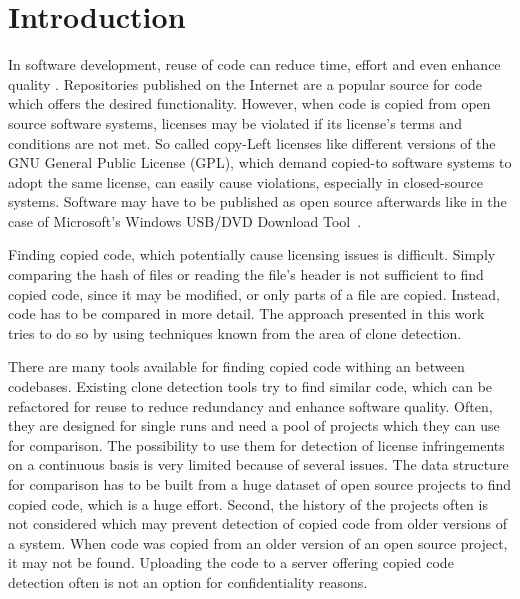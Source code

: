 
\chapter{Introduction}\label{chapter:introduction}
In software development, reuse of code can reduce time, effort and even enhance quality \cite{krueger1992software}.
Repositories published on the Internet are a popular source for code which offers the desired functionality.
However, when code is copied from open source software systems, licenses may be violated if its license's terms and conditions are not met.
So called copy-Left licenses like different versions of the GNU General Public License (GPL), which demand copied-to software systems to adopt the same license, can easily cause violations, especially in closed-source systems.
Software may have to be published as open source afterwards like in the case of Microsoft's \glqq Windows USB/DVD Download Tool\grqq \ \cite{microsoft2009download}.

Finding copied code, which potentially cause licensing issues is difficult.
Simply comparing the hash of files or reading the file's header is not sufficient to find copied code, since it may be modified, or only parts of a file are copied.
Instead, code has to be compared in more detail.
The approach presented in this work tries to do so by using techniques known from the area of clone detection.

There are many tools available for finding copied code withing an between codebases.
Existing clone detection tools try to find similar code, which can be refactored for reuse to reduce redundancy and enhance software quality.
Often, they are designed for single runs and need a pool of projects which they can use for comparison.
The possibility to use them for detection of license infringements on a continuous basis is very limited because of several issues.
The data structure for comparison has to be built from a huge dataset of open source projects to find copied code, which is a huge effort.
Second, the history of the projects often is not considered which may prevent detection of copied code from older versions of a system.
When code was copied from an older version of an open source project, it may not be found.
Uploading the code to a server offering copied code detection often is not an option for confidentiality reasons.

